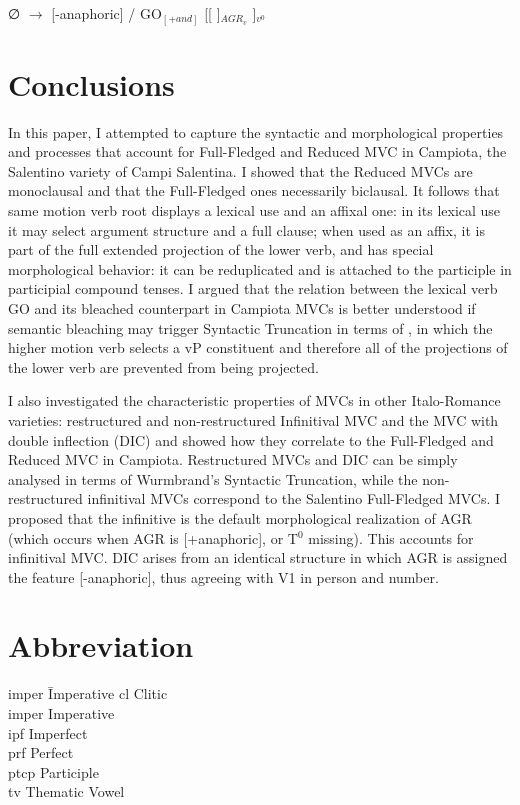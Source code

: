 \documentclass[output=paper]{langscibook}
\begin{document}
\ea \label{ac101}∅ $\rightarrow$ [-anaphoric] /  GO$_{[+and]}$ [[ \underline{\hspace{3em}} ]$_{ AGR_v}$ ]$_{v^0}$
\z

\section{Conclusions} 
 
In this paper, I attempted to capture the syntactic and morphological properties and processes that account for Full-Fledged and Reduced MVC in Campiota, the Salentino variety of Campi Salentina. I showed that the Reduced MVCs are monoclausal and that the Full-Fledged ones necessarily biclausal. It follows that same motion verb root displays a lexical use and an affixal one:  in its lexical use it may select argument structure and a full clause; when used as an affix, it is part of the full extended projection of the lower verb, and has special morphological behavior: it can be reduplicated and is attached to the participle in participial compound tenses. I argued that the relation between the lexical verb GO and its bleached counterpart in Campiota MVCs is better understood if semantic bleaching may trigger Syntactic Truncation  in terms of \citealt{wurmbrand2014a, wurmbrand2015, wurmbrand2017verb}, in which the higher motion verb selects a vP constituent and therefore all of the projections of the lower verb are prevented from being projected. 
 
I also investigated the characteristic properties of MVCs in other Italo-Romance varieties: restructured and non-restructured Infinitival MVC and the MVC with double inflection (DIC) and showed how they correlate to the Full-Fledged and Reduced MVC in Campiota.  Restructured MVCs and DIC can be simply analysed in terms of Wurmbrand's Syntactic Truncation, while the non-restructured infinitival MVCs correspond to the Salentino Full-Fledged MVCs.  I proposed that the infinitive is the default morphological realization of AGR (which occurs when AGR is [+anaphoric], or T$^0$ missing).  This accounts for infinitival MVC.  DIC arises from an identical structure in which AGR is assigned the feature [-anaphoric], thus agreeing with V1 in person and number. 

\section*{Abbreviation}
\begin{multicols}{2}
\begin{tabbing}
{\sc imper}\hspace{.5ex} \= Imperative \kill
{\sc cl} \> Clitic \\
{\sc imper} \> Imperative \\
{\sc ipf} \> Imperfect\\
{\sc prf} \> Perfect\\
{\sc ptcp} \> Participle\\
{\sc tv} \> Thematic Vowel\\
\end{tabbing}
\end{multicols}
\end{document}
